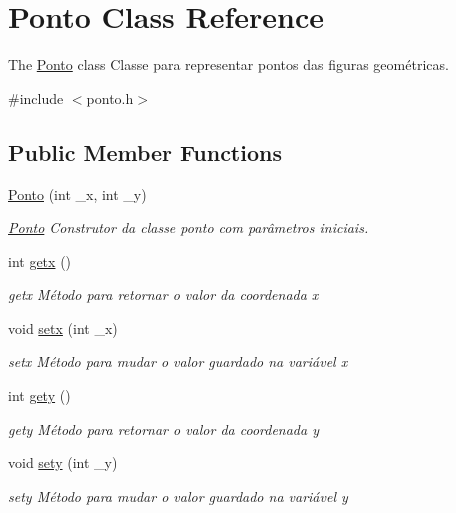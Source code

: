 \hypertarget{class_ponto}{}\section{Ponto Class Reference}
\label{class_ponto}


The \mbox{\hyperlink{class_ponto}{Ponto}} class Classe para representar pontos das figuras geométricas.  




{\ttfamily \#include $<$ponto.\+h$>$}

\subsection*{Public Member Functions}
\begin{DoxyCompactItemize}
\item 
\mbox{\hyperlink{class_ponto_aab845b69e717a88f821eac509ae61d0c}{Ponto}} (int \+\_\+x, int \+\_\+y)
\begin{DoxyCompactList}\small\item\em \mbox{\hyperlink{class_ponto}{Ponto}} Construtor da classe ponto com parâmetros iniciais. \end{DoxyCompactList}\item 
int \mbox{\hyperlink{class_ponto_a46143a67138fec36b9aa71903accee5a}{getx}} ()
\begin{DoxyCompactList}\small\item\em getx Método para retornar o valor da coordenada x \end{DoxyCompactList}\item 
void \mbox{\hyperlink{class_ponto_ab49e43abd7833943dc2caaa6dff012c2}{setx}} (int \+\_\+x)
\begin{DoxyCompactList}\small\item\em setx Método para mudar o valor guardado na variável x \end{DoxyCompactList}\item 
int \mbox{\hyperlink{class_ponto_a383a1698d34a2bc2cc84293e951d0f3b}{gety}} ()
\begin{DoxyCompactList}\small\item\em gety Método para retornar o valor da coordenada y \end{DoxyCompactList}\item 
void \mbox{\hyperlink{class_ponto_a13ea5b12596fc0b8b725115d56404e20}{sety}} (int \+\_\+y)
\begin{DoxyCompactList}\small\item\em sety Método para mudar o valor guardado na variável y \end{DoxyCompactList}\end{DoxyCompactItemize}


